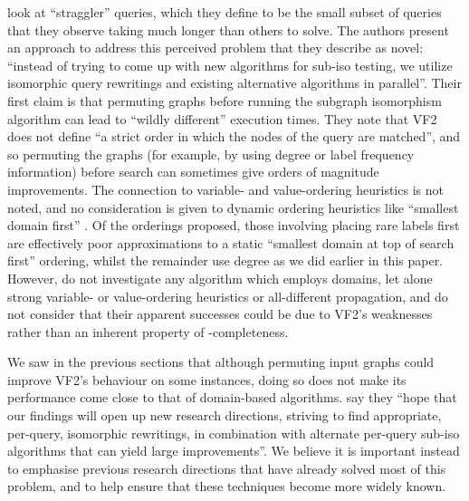\documentclass[twoside,11pt]{article}
\newcommand{\citet}[1]{\citeA{#1}}
\newcommand{\citep}[1]{\cite{#1}}
\begin{document}
\citet{DBLP:conf/edbt/KatsarouNT17} look at ``straggler'' queries, which they define
to be the small subset of queries that they observe taking much longer than others to solve. The
authors present an approach to address this perceived problem that they describe as novel: ``instead
of trying to come up with new algorithms for sub-iso testing, we utilize isomorphic query rewritings
and existing alternative algorithms in parallel''. Their first claim is that permuting graphs before
running the subgraph isomorphism algorithm can lead to ``wildly different'' execution times. They
note that VF2 does not define ``a strict order in which the nodes of the query are matched'', and so
permuting the graphs (for example, by using degree or label frequency information) before search can
sometimes give orders of magnitude improvements. The connection to variable- and value-ordering
heuristics is not noted, and no consideration is given to dynamic ordering
heuristics like ``smallest domain first'' \citep{DBLP:journals/ai/HaralickE80}.
Of the orderings proposed, those involving placing rare labels first are effectively poor
approximations to a static ``smallest domain at top of search first'' ordering, whilst the remainder
use degree as we did earlier in this paper. However, \citeauthor{DBLP:conf/edbt/KatsarouNT17} do not
investigate any algorithm which employs domains, let alone strong variable- or value-ordering
heuristics or all-different propagation, and do not consider that their apparent successes could be
due to VF2's weaknesses rather than an inherent property of \NP-completeness.

We saw in the previous sections that although permuting input graphs could improve VF2's behaviour
on some instances, doing so does not make its performance come close to that of domain-based
algorithms.  \citeauthor{DBLP:conf/edbt/KatsarouNT17} say they ``hope that our findings will open up
new research directions, striving to find appropriate, per-query, isomorphic rewritings, in
combination with alternate per-query sub-iso algorithms that can yield large improvements''. We
believe it is important instead to emphasise previous research directions that have already solved
most of this problem, and to help ensure that these techniques become more widely known.
\end{document}
